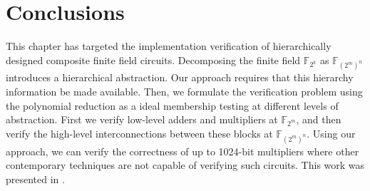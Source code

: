 \section{Conclusions}
This chapter has targeted the implementation verification of
hierarchically designed composite finite field circuits. 
Decomposing the finite field $\mathbb{F}_{2^k}$ as $\mathbb{F}_{(2^m)^n}$ 
introduces a hierarchical abstraction. Our approach requires that
this hierarchy information be made available. Then, we formulate the
verification problem using the polynomial reduction
as a ideal membership testing at different levels of abstraction.
First we verify low-level adders and
multipliers at $\mathbb{F}_{2^m}$, and then verify the high-level
interconnections between these blocks at $\mathbb{F}_{(2^m)^n}$. Using our
approach, we can verify the correctness of up to 1024-bit multipliers
where other contemporary techniques are not capable of verifying such circuits.
This work was presented in \cite{lv:hldvt2011}.
